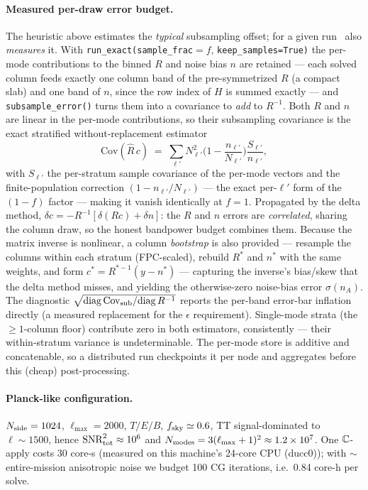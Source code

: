 \paragraph{Measured per-draw error budget.} The heuristic above estimates the
\emph{typical} subsampling offset; for a given run \simaster\ also
\emph{measures} it. With \texttt{run\_exact(sample\_frac}$=f$,
\texttt{keep\_samples=True)} the per-mode contributions to the binned $R$ and
noise bias $n$ are retained --- each solved column feeds exactly one column
band of the pre-symmetrized $R$ (a compact slab) and one band of $n$, since
the row index of $H$ is summed exactly --- and \texttt{subsample\_error()}
turns them into a covariance to \emph{add} to $R^{-1}$.  Both $R$ and $n$ are
linear in the per-mode contributions, so their subsampling covariance is the
exact stratified without-replacement estimator
\begin{equation}
  \mathrm{Cov}(\hat R\,c) \;=\; \sum_{\ell'} N_{\ell'}^2
  \Big(1-\frac{n_{\ell'}}{N_{\ell'}}\Big)\frac{S_{\ell'}}{n_{\ell'}},
  \label{eq:strat}
\end{equation}
with $S_{\ell'}$ the per-stratum sample covariance of the per-mode vectors and
the finite-population correction $(1-n_{\ell'}/N_{\ell'})$ --- the exact
per-$\ell'$ form of the $(1-f)$ factor --- making it vanish identically at
$f=1$.  Propagated by the delta method, $\delta c = -R^{-1}[\delta(Rc)+\delta
n]$: the $R$ and $n$ errors are \emph{correlated}, sharing the column draw, so
the honest bandpower budget combines them.  Because the matrix inverse is
nonlinear, a column \emph{bootstrap} is also provided --- resample the columns
within each stratum (FPC-scaled), rebuild $R^*$ and $n^*$ with the same
weights, and form $c^*=R^{*-1}(y-n^*)$ --- capturing the inverse's bias/skew
that the delta method misses, and yielding the otherwise-zero noise-bias error
$\sigma(n_A)$.  The diagnostic $\sqrt{\mathrm{diag}\,\mathrm{Cov}_{\rm
sub}/\mathrm{diag}\,R^{-1}}$ reports the per-band error-bar inflation directly
(a measured replacement for the $\epsilon$ requirement).  Single-mode strata
(the $\ge1$-column floor) contribute zero in both estimators, consistently ---
their within-stratum variance is undeterminable.  The per-mode store is
additive and concatenable, so a distributed run checkpoints it per node and
aggregates before this (cheap) post-processing.

\paragraph{Planck-like configuration.} $N_{\rm side}=1024$,
$\ell_{\max}=2000$, $T/E/B$, $f_{\rm sky}\simeq0.6$,
TT signal-dominated to $\ell\sim1500$, hence
$\mathrm{SNR}^2_{\rm tot}\approx10^6$ and
$N_{\rm modes}=3(\ell_{\max}+1)^2\approx1.2\times10^7$.
One $\mathbb{C}$-apply costs 30 core-s (measured on this machine's 24-core CPU (ducc0)); with
$\sim$entire-mission anisotropic noise we budget 100 CG iterations,
i.e.\ 0.84 core-h per solve.

